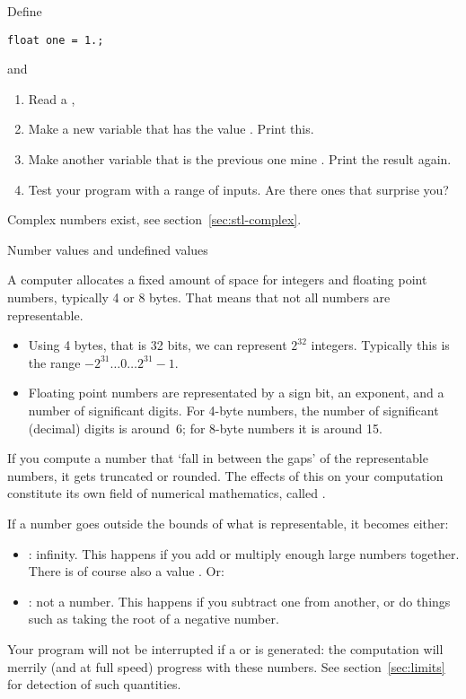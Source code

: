 \begin{exercise}
  \label{ex:macheps}
  Define 
\begin{lstlisting}
float one = 1.;
\end{lstlisting}
and
  \begin{enumerate}
  \item Read a ,
  \item Make a new variable that has the value . Print
    this.
  \item Make another variable that is the previous one mine
    . Print the result again.
  \item Test your program with a range of inputs. Are there ones that
    surprise you?  
  \end{enumerate}

\end{exercise}

Complex numbers exist, see section~\ref{sec:stl-complex}.

 {Number values and undefined values}
\label{sec:naninf}

A computer allocates a fixed amount of space for integers and floating
point numbers, typically 4 or 8 bytes. That means that not all numbers
are representable.
\begin{itemize}
\item Using 4 bytes, that is 32 bits, we can represent $2^{32}$
  integers. Typically this is the range $-2^{31}\ldots 0 \ldots
  2^{31}-1$.
\item Floating point numbers are representated by a sign bit, an
  exponent, and a number of significant digits.
  For 4-byte numbers, the number of significant (decimal) digits is
  around~6; for 8-byte numbers it is around 15.
\end{itemize}

If you compute a number that `fall in between the gaps' of the
representable numbers, it gets truncated or rounded. The effects of
this on your computation constitute its own field of numerical
mathematics, called .

If a number goes outside the bounds of what is representable, it
becomes either:
\begin{itemize}
\item {}: infinity. This happens if you add or multiply
  enough large numbers together. There is of course also a value
  . Or:
\item {}: not a number. This happens if you subtract
  one  from another, or do things such as taking the
  root of a negative number.
\end{itemize}
Your program will not be interrupted if a  or  is
generated: the computation will merrily (and at full speed) progress
with these numbers. See section~\ref{sec:limits} for detection of such quantities.

